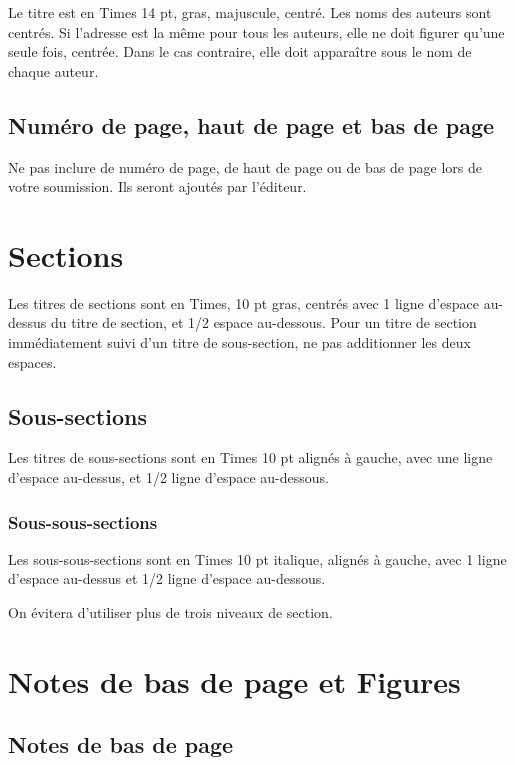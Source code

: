 \documentclass{article}
\begin{document}
Le titre est en Times 14 pt, gras, majuscule, centré. Les noms des auteurs sont centrés. Si l'adresse est la même pour tous les auteurs, elle ne doit figurer qu'une seule fois, centrée. Dans le cas contraire, elle doit apparaître sous le nom de chaque auteur.

\subsection{Numéro de page, haut de page et  bas de page}

Ne pas inclure  de numéro de page, de haut de page ou de bas de page lors de votre soumission. Ils seront ajoutés par l'éditeur.

\section{Sections}

Les titres de sections sont en Times, 10 pt gras, centrés avec 1 ligne d'espace au-dessus du titre de section, et 1/2 espace au-dessous. Pour un titre de section immédiatement suivi d'un titre de sous-section, ne pas additionner les deux espaces.

\subsection{Sous-sections}

Les titres de sous-sections sont en Times 10 pt alignés à gauche, avec une ligne d'espace au-dessus, et 1/2 ligne d'espace au-dessous.

\subsubsection{Sous-sous-sections}

Les sous-sous-sections sont en Times 10 pt italique, alignés à gauche, avec 1 ligne d'espace au-dessus et 1/2 ligne d'espace au-dessous.

On évitera d'utiliser plus de trois niveaux de section.


\section{Notes de bas de page et Figures}

\subsection{Notes de bas de page}
\end{document}
